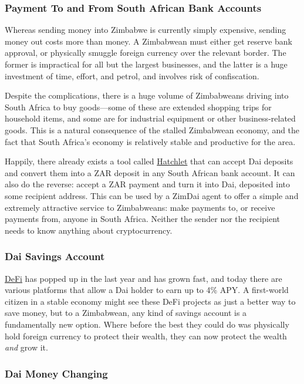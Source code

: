\documentclass{article}
\begin{document}
\subsubsection{Payment To and From South African Bank Accounts} \label{south african accounts}

Whereas sending money into Zimbabwe is currently simply expensive, sending money out costs more than money. A Zimbabwean must either get reserve bank approval, or physically smuggle foreign currency over the relevant border. The former is impractical for all but the largest businesses, and the latter is a huge investment of time, effort, and petrol, and involves risk of confiscation.

Despite the complications, there is a huge volume of Zimbabweans driving into South Africa to buy goods---some of these are extended shopping trips for household items, and some are for industrial equipment or other business-related goods. This is a natural consequence of the stalled Zimbabwean economy, and the fact that South Africa's economy is relatively stable and productive for the area.

Happily, there already exists a tool called \href{https://hatchlet.co/}{Hatchlet} that can accept Dai deposits and convert them into a ZAR deposit in any South African bank account. It can also do the reverse: accept a ZAR payment and turn it into Dai, deposited into some recipient address. This can be used by a ZimDai agent to offer a simple and extremely attractive service to Zimbabweans: make payments to, or receive payments from, anyone in South Africa. Neither the sender nor the recipient needs to know anything about cryptocurrency.

\subsubsection{Dai Savings Account} \label{savings}

\href{https://blockonomi.com/what-is-decentralized-finance-defi/}{DeFi} has popped up in the last year and has grown fast, and today there are various platforms that allow a Dai holder to earn up to 4\% APY. A first-world citizen in a stable economy might see these DeFi projects as just a better way to save money, but to a Zimbabwean, any kind of savings account is a fundamentally new option. Where before the best they could do was physically hold foreign currency to protect their wealth, they can now protect the wealth \textit{and} grow it.

\subsubsection{Dai Money Changing} \label{dai money changing}
\end{document}
